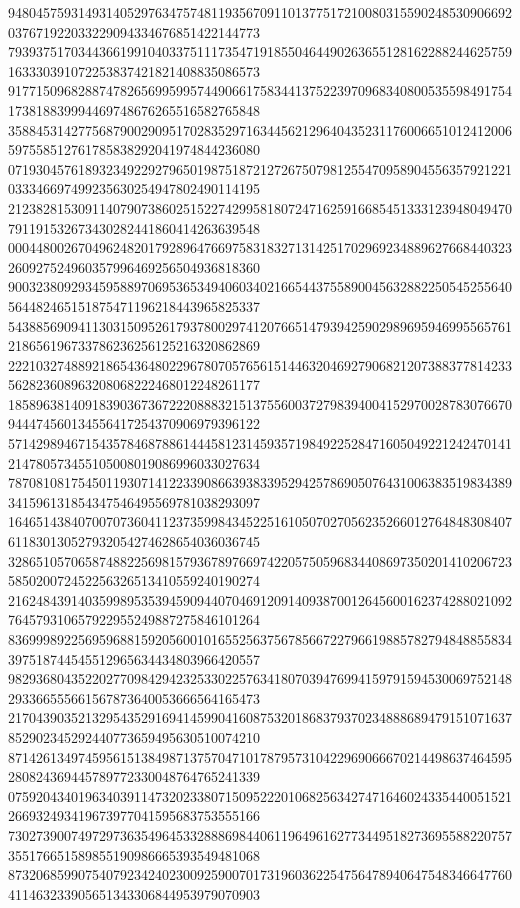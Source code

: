 \begin{DoxyCode}
      948045759314931405297634757481193567091101377517210080315590248530906692037671922033229094334676851422144773
      793937517034436619910403375111735471918550464490263655128162288244625759163330391072253837421821408835086573
      917715096828874782656995995744906617583441375223970968340800535598491754173818839994469748676265516582765848
      358845314277568790029095170283529716344562129640435231176006651012412006597558512761785838292041974844236080
      071930457618932349229279650198751872127267507981255470958904556357921221033346697499235630254947802490114195
      212382815309114079073860251522742995818072471625916685451333123948049470791191532673430282441860414263639548
      000448002670496248201792896476697583183271314251702969234889627668440323260927524960357996469256504936818360
      900323809293459588970695365349406034021665443755890045632882250545255640564482465151875471196218443965825337
      543885690941130315095261793780029741207665147939425902989695946995565761218656196733786236256125216320862869
      222103274889218654364802296780705765615144632046927906821207388377814233562823608963208068222468012248261177
      185896381409183903673672220888321513755600372798394004152970028783076670944474560134556417254370906979396122
      571429894671543578468788614445812314593571984922528471605049221242470141214780573455105008019086996033027634
      787081081754501193071412233908663938339529425786905076431006383519834389341596131854347546495569781038293097
      164651438407007073604112373599843452251610507027056235266012764848308407611830130527932054274628654036036745
      328651057065874882256981579367897669742205750596834408697350201410206723585020072452256326513410559240190274
      216248439140359989535394590944070469120914093870012645600162374288021092764579310657922955249887275846101264
      836999892256959688159205600101655256375678566722796619885782794848855834397518744545512965634434803966420557
      982936804352202770984294232533022576341807039476994159791594530069752148293366555661567873640053666564165473
      217043903521329543529169414599041608753201868379370234888689479151071637852902345292440773659495630510074210
      871426134974595615138498713757047101787957310422969066670214498637464595280824369445789772330048764765241339
      075920434019634039114732023380715095222010682563427471646024335440051521266932493419673977041595683753555166
      730273900749729736354964533288869844061196496162773449518273695588220757355176651589855190986665393549481068
      873206859907540792342402300925900701731960362254756478940647548346647760411463233905651343306844953979070903

\end{DoxyCode}
